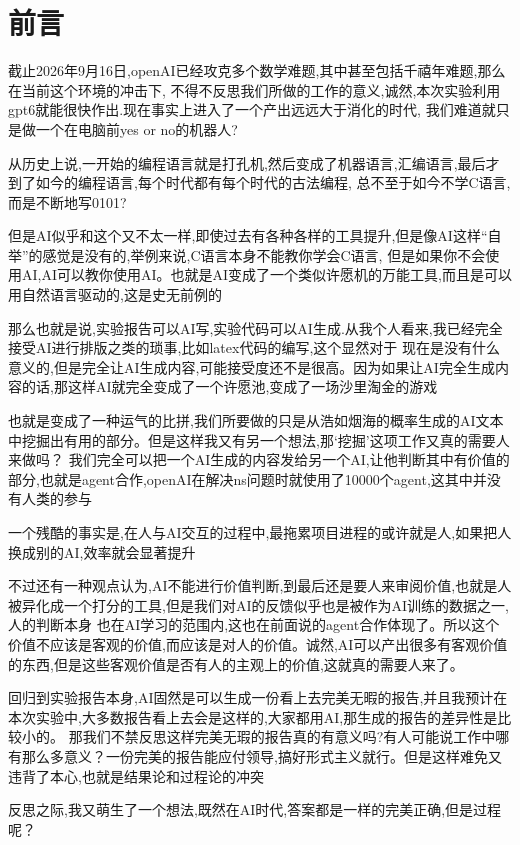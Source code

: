 \section{前言}
截止2026年9月16日,openAI已经攻克多个数学难题,其中甚至包括千禧年难题,那么在当前这个环境的冲击下,
不得不反思我们所做的工作的意义,诚然,本次实验利用gpt6就能很快作出.现在事实上进入了一个产出远远大于消化的时代,
我们难道就只是做一个在电脑前yes or no的机器人?

从历史上说,一开始的编程语言就是打孔机,然后变成了机器语言,汇编语言,最后才到了如今的编程语言,每个时代都有每个时代的古法编程,
总不至于如今不学C语言,而是不断地写0101?

但是AI似乎和这个又不太一样,即使过去有各种各样的工具提升,但是像AI这样“自举”的感觉是没有的,举例来说,C语言本身不能教你学会C语言,
但是如果你不会使用AI,AI可以教你使用AI。也就是AI变成了一个类似许愿机的万能工具,而且是可以用自然语言驱动的,这是史无前例的

那么也就是说,实验报告可以AI写,实验代码可以AI生成.从我个人看来,我已经完全接受AI进行排版之类的琐事,比如latex代码的编写,这个显然对于
现在是没有什么意义的,但是完全让AI生成内容,可能接受度还不是很高。因为如果让AI完全生成内容的话,那这样AI就完全变成了一个许愿池,变成了一场沙里淘金的游戏

也就是变成了一种运气的比拼,我们所要做的只是从浩如烟海的概率生成的AI文本中挖掘出有用的部分。但是这样我又有另一个想法,那‘挖掘’这项工作又真的需要人来做吗？
我们完全可以把一个AI生成的内容发给另一个AI,让他判断其中有价值的部分,也就是agent合作,openAI在解决ns问题时就使用了10000个agent,这其中并没有人类的参与

一个残酷的事实是,在人与AI交互的过程中,最拖累项目进程的或许就是人,如果把人换成别的AI,效率就会显著提升

不过还有一种观点认为,AI不能进行价值判断,到最后还是要人来审阅价值,也就是人被异化成一个打分的工具,但是我们对AI的反馈似乎也是被作为AI训练的数据之一,人的判断本身
也在AI学习的范围内,这也在前面说的agent合作体现了。所以这个价值不应该是客观的价值,而应该是对人的价值。诚然,AI可以产出很多有客观价值的东西,但是这些客观价值是否有人的主观上的价值,这就真的需要人来了。

回归到实验报告本身,AI固然是可以生成一份看上去完美无暇的报告,并且我预计在本次实验中,大多数报告看上去会是这样的,大家都用AI,那生成的报告的差异性是比较小的。
那我们不禁反思这样完美无瑕的报告真的有意义吗?有人可能说工作中哪有那么多意义？一份完美的报告能应付领导,搞好形式主义就行。但是这样难免又违背了本心,也就是结果论和过程论的冲突

反思之际,我又萌生了一个想法,既然在AI时代,答案都是一样的完美正确,但是过程呢？


